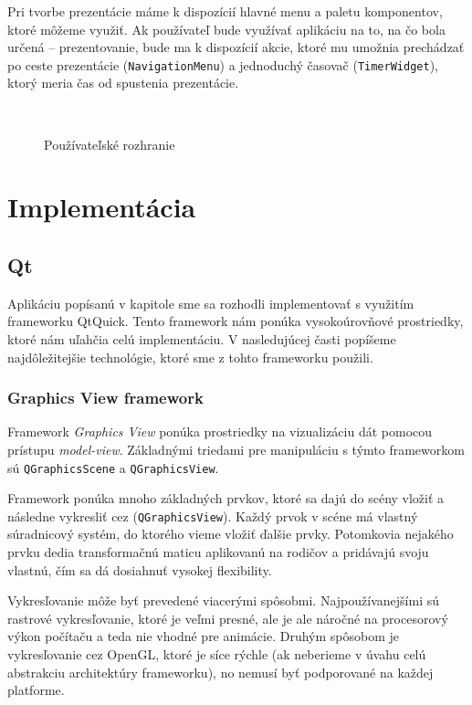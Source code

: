 Pri tvorbe prezentácie máme k dispozícií hlavné menu a paletu komponentov, ktoré môžeme využiť. Ak používateľ bude využívať aplikáciu na to, na čo bola určená -- prezentovanie, bude ma k dispozícií akcie, ktoré mu umožnia prechádzať po ceste prezentácie (\texttt{NavigationMenu}) a jednoduchý časovač (\texttt{TimerWidget}), ktorý meria čas od spustenia prezentácie.

\begin{figure}
 \centering
  \\
 \caption{Používateľské rozhranie}
 \label{fig:ui}
\end{figure}

\chapter{Implementácia} \label{ch:implementacia}

\section{Qt}

Aplikáciu popísanú v kapitole  sme sa rozhodli implementovať s využitím frameworku QtQuick. Tento framework nám ponúka vysokoúrovňové prostriedky, ktoré nám uľahčia celú implementáciu. V nasledujúcej časti popíšeme najdôležitejšie technológie, ktoré sme z tohto frameworku použili.

\subsection{Graphics View framework}

Framework \textit{Graphics View} ponúka prostriedky na vizualizáciu dát pomocou prístupu \textit{model-view}. Základnými triedami pre manipuláciu s týmto frameworkom sú \texttt{QGraphics\-Scene} a \texttt{QGraphicsView}.

Framework ponúka mnoho základných prvkov, ktoré sa dajú do scény vložiť a následne vykresliť cez  (\texttt{QGraphicsView}). Každý prvok v scéne má vlastný súradnicový systém, do ktorého vieme vložiť ďalšie prvky. Potomkovia nejakého prvku dedia transformačnú maticu aplikovanú na rodičov a pridávajú svoju vlastnú, čím sa dá dosiahnuť vysokej flexibility.

Vykresľovanie môže byť prevedené viacerými spôsobmi. Najpoužívanejšími sú rastrové vykresľovanie, ktoré je veľmi presné, ale je ale náročné na procesorový výkon počítaču a teda nie vhodné pre animácie. Druhým spôsobom je vykresľovanie cez OpenGL, ktoré je síce rýchle (ak neberieme v úvahu celú abstrakciu architektúry frameworku), no nemusí byť podporované na každej platforme.

